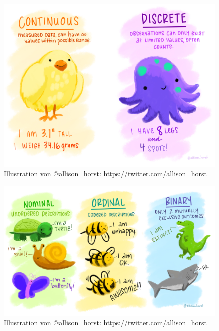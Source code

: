 \documentclass[
]{article}
\begin{document}
\begin{figure}

{\centering \includegraphics[width=1\linewidth]{images/018} 

}

\caption{Illustration von @allison_horst: https://twitter.com/allison_horst}\label{fig:unnamed-chunk-39}
\end{figure}

\begin{figure}

{\centering \includegraphics[width=1\linewidth]{images/019} 

}

\caption{Illustration von @allison_horst: https://twitter.com/allison_horst}\label{fig:unnamed-chunk-40}
\end{figure}
\end{document}
